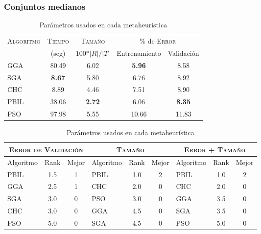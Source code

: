\blindtext

\subsubsection{Conjuntos medianos}

\blindtext

\begin{table}[h!]
\centering
\begin{tabular}{l c c c c}
\hline
\multirow{2}{*}{\textsc{Algoritmo}}
	& \textsc{Tiempo} & \textsc{Tamaño}
	& \multicolumn{2}{c}{$\%$ de \textsc{Error}} \\\cline{4-5}
 & \scriptsize{(seg)} & \scriptsize{$100*\vert R \vert / \vert T \vert$}
	& \scriptsize{Entrenamiento} & \scriptsize{Validación} \\
\hline
\hline
GGA  & 80.49 & 6.02 &  \textbf{5.96} &  8.58 \\
SGA  & \textbf{8.67} & 5.80 &  6.76 &  8.92 \\
CHC  &  8.89 & 4.46 &  7.51 &  8.90 \\
PBIL & 38.06 & \textbf{2.72} &  6.06 &  \textbf{8.35} \\
PSO  & 97.98 & 5.55 & 10.66 & 11.83 \\
\hline
\end{tabular}
\caption{Parámetros usados en cada metaheurística}
\label{res-med}
\end{table}

\blindtext

\begin{table}[h!]
\centering
\begin{tabular}{l c c|l c c|l c c}
\hline
\multicolumn{3}{c|}{\textsc{Error de Validación}}
	& \multicolumn{3}{c|}{\textsc{Tamaño}}
	& \multicolumn{3}{c}{\textsc{Error + Tamaño}} \\
\hline
Algoritmo & Rank & Mejor & Algoritmo & Rank & Mejor & Algoritmo & Rank & Mejor \\
\hline
\hline
PBIL & 1.5 & 1 & PBIL & 1.0 & 2 & PBIL & 1.0 & 2 \\
GGA  & 2.5 & 1 & CHC  & 2.0 & 0 & CHC  & 2.0 & 0 \\
SGA  & 3.0 & 0 & PSO  & 3.0 & 0 & GGA  & 3.5 & 0 \\
CHC  & 3.0 & 0 & GGA  & 4.5 & 0 & SGA  & 3.5 & 0 \\
PSO  & 5.0 & 0 & SGA  & 4.5 & 0 & PSO  & 5.0 & 0 \\
\hline
\end{tabular}
\caption{Parámetros usados en cada metaheurística}
\label{res-med-rank}
\end{table}


